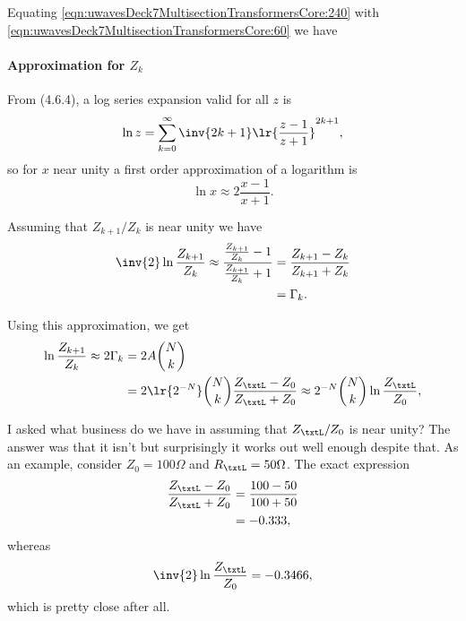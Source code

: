 Equating \cref{eqn:uwavesDeck7MultisectionTransformersCore:240} with \cref{eqn:uwavesDeck7MultisectionTransformersCore:60} we have
\paragraph{Approximation for \( Z_k \)}
From \citep{NIST:DLMF} (4.6.4), a log series expansion valid for all \( z \) is
\begin{equation}\label{eqn:uwavesDeck7MultisectionTransformersCore:320}
\ln z = \sum_{k = 0}^\infty \inv{2 k + 1} \lr{ \frac{ z - 1 }{z + 1} }^{2k + 1},
\end{equation}
so for \( x \) near unity a first order approximation of a logarithm is
\begin{equation}\label{eqn:uwavesDeck7MultisectionTransformersCore:340}
\ln x \approx 2 \frac{x -1}{x+1}.
\end{equation}

Assuming that \( Z_{k+1}/Z_k \) is near unity we have
\begin{equation}\label{eqn:uwavesDeck7MultisectionTransformersCore:360}
\begin{aligned}
\inv{2} \ln \frac{Z_{k+1}}{Z_k}
\approx
\frac{ \frac{Z_{k+1}}{Z_k} - 1 }{\frac{Z_{k+1}}{Z_k} + 1}
&=
\frac{ Z_{k+1} - Z_k }{Z_{k+1} + Z_k}
\\ &=
\Gamma_k.
\end{aligned}
\end{equation}

Using this approximation, we get
\begin{equation}\label{eqn:uwavesDeck7MultisectionTransformersCore:380}
\begin{aligned}
\ln \frac{Z_{k+1}}{Z_k}
\approx
2 \Gamma_k
&= 2 A \binom{N}{k}
\\ &= 2 \lr{2^{-N}} \binom{N}{k} \frac{Z_\txtL - Z_0}{Z_\txtL + Z_0}
\approx
2^{-N} \binom{N}{k} \ln \frac{Z_\txtL}{Z_0},
\end{aligned}
\end{equation}

I asked what business do we have in assuming that \( Z_\txtL/Z_0 \) is near unity?  The answer was that it isn't but surprisingly it works out well enough despite that.  As an example, consider \( Z_0 = 100 \Omega \) and \( R_\txtL = 50 \Omega \).  The exact expression
\begin{equation}\label{eqn:uwavesDeck7MultisectionTransformersCore:880}
\begin{aligned}
\frac{Z_\txtL - Z_0}{Z_\txtL + Z_0}
&= \frac{100-50}{100+50}
\\ &= -0.333,
\end{aligned}
\end{equation}
whereas
\begin{equation}\label{eqn:uwavesDeck7MultisectionTransformersCore:900}
\inv{2} \ln \frac{Z_\txtL}{Z_0} = -0.3466,
\end{equation}
which is pretty close after all.

